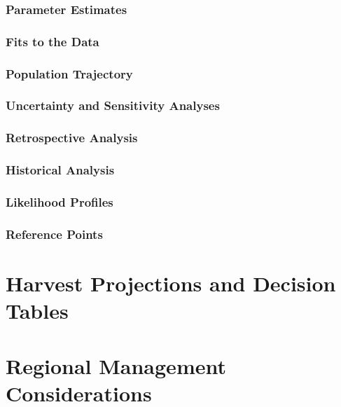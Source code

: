 \documentclass[12pt,]{article}
\begin{document}
\subsubsection{Parameter Estimates}\label{parameter-estimates}

\subsubsection{Fits to the Data}\label{fits-to-the-data}

\subsubsection{Population Trajectory}\label{population-trajectory}

\subsubsection{Uncertainty and Sensitivity
Analyses}\label{uncertainty-and-sensitivity-analyses}

\subsubsection{Retrospective Analysis}\label{retrospective-analysis}

\subsubsection{Historical Analysis}\label{historical-analysis}

\subsubsection{Likelihood Profiles}\label{likelihood-profiles}

\subsubsection{Reference Points}\label{reference-points-1}

\section{Harvest Projections and Decision
Tables}\label{harvest-projections-and-decision-tables}

\section{Regional Management
Considerations}\label{regional-management-considerations}
\end{document}
